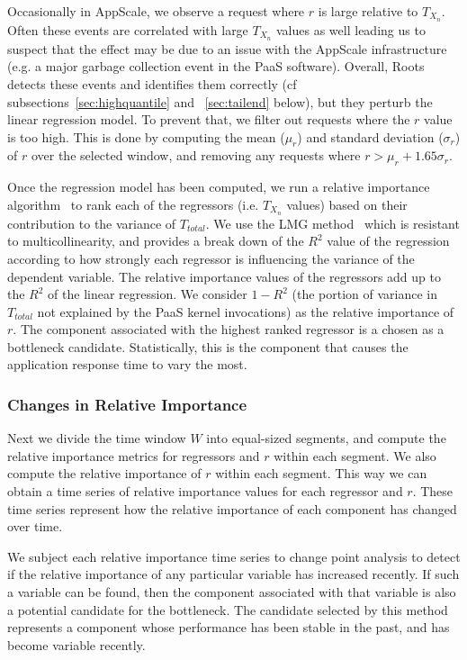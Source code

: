 Occasionally in AppScale, we observe a request where $r$ is
large relative to $T_{X_n}$.  Often these events are correlated with large
$T_{X_n}$ values as well leading us to suspect that the effect may be due to
an issue with the AppScale infrastructure (e.g. a major garbage collection
event in the PaaS software).  Overall, Roots detects these events and identifies them correctly (cf
subsections~\ref{sec:highquantile} and ~\ref{sec:tailend} below), but they
perturb the linear regression model.  To prevent that,
we filter out requests where the $r$ value is too high. This
is done by computing the mean ($\mu_r$) and standard deviation ($\sigma_r$) of $r$ 
over the selected window, and removing 
any requests where $r > \mu_r + 1.65\sigma_r$.

Once the regression model has been computed, we run a relative importance algorithm~\cite{JSSv017i01} to rank each of the
regressors (i.e. $T_{X_n}$ values) based on their contribution to the variance of $T_{total}$. 
We use the LMG method~\cite{lmg80} which is resistant to multicollinearity, and provides a break down of the $R^2$ value of
the regression according to how strongly each regressor is influencing the variance of the dependent variable.
The relative importance values of the regressors add up to the $R^2$ of the linear regression. We consider
$1 - R^2$ (the portion of variance in $T_{total}$ not explained by the PaaS kernel invocations) as the relative importance of $r$. 
The component associated with the highest ranked regressor is a chosen as a bottleneck candidate.
Statistically, this is the component that causes the application response time to vary the most.

\subsubsection{Changes in Relative Importance}
Next we divide the time window $W$ into equal-sized segments,
and compute the relative importance metrics for regressors and $r$ within each segment. We also compute the
relative importance of $r$ within each segment. This way we can
obtain a time series of relative importance values for each regressor and $r$. These time series
represent how the relative importance of each component has changed over time.

We subject each relative importance time series to change point analysis to detect if the relative importance of any particular
variable has increased recently. If such a variable can be found, then the component
associated with that variable is also a potential candidate for the bottleneck. 
The candidate selected by this method represents
a component whose performance has been stable in the past, and has become variable recently. 

